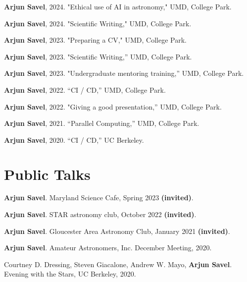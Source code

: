 \documentclass[letterpaper,10.5pt]{article}
\newcommand{\shorterSection}[1]{\vspace{-10pt}\section{#1}}
\begin{document}
\small
  \begin{list}{}{\cvlist}
  \item[{\color{numcolor}\scriptsize9}]
\textbf{Arjun Savel}, 2024. "Ethical use of AI in astronomy," UMD, College Park.
  \item[{\color{numcolor}\scriptsize8}]
\textbf{Arjun Savel}, 2024. "Scientific Writing," UMD, College Park.
\item[{\color{numcolor}\scriptsize7}] 
\textbf{Arjun Savel}, 2023. "Preparing a CV," UMD, College Park.\item[{\color{numcolor}\scriptsize6}]
\textbf{Arjun Savel}, 2023. "Scientific Writing,” UMD, College Park.\item[{\color{numcolor}\scriptsize5}] \textbf{Arjun Savel}, 2023. "Undergraduate mentoring training,” UMD, College Park.
  \item[{\color{numcolor}\scriptsize4}] \textbf{Arjun Savel}, 2022. “CI / CD,” UMD, College Park.
  \item[{\color{numcolor}\scriptsize3}] \textbf{Arjun Savel}, 2022. "Giving a good presentation,” UMD, College Park.
  \item[{\color{numcolor}\scriptsize2}] \textbf{Arjun Savel}, 2021. “Parallel Computing,” UMD, College Park.
  \item[{\color{numcolor}\scriptsize1}] \textbf{Arjun Savel}, 2020. “CI / CD,” UC Berkeley.
  \end{list}

\shorterSection{Public Talks}
\begin{list}{}{\cvlist}
\item[{\color{numcolor}\scriptsize5}] \textbf{Arjun Savel}. Maryland Science Cafe, Spring 2023 \textbf{(invited)}.
\item[{\color{numcolor}\scriptsize4}] \textbf{Arjun Savel}. STAR astronomy club, October 2022 \textbf{(invited)}.
\item[{\color{numcolor}\scriptsize3}] \textbf{Arjun Savel}. Gloucester Area Astronomy Club, January 2021 \textbf{(invited)}.
\item[{\color{numcolor}\scriptsize2}] \textbf{Arjun Savel}. Amateur Astronomers, Inc. December Meeting, 2020.
\item[{\color{numcolor}\scriptsize1}] Courtney D. Dressing, Steven Giacalone, Andrew W. Mayo, \textbf{Arjun Savel}. Evening with the Stars, UC Berkeley, 2020.
\end{list}
\end{document}
